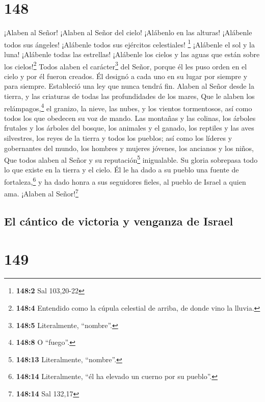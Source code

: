 \hypertarget{section-147}{%
\section{148}\label{section-147}}

 ¡Alaben al Señor! ¡Alaben al Señor del cielo! ¡Alábenlo
en las alturas!  ¡Alábenle todos sus ángeles! ¡Alábenle
todos sus ejércitos celestiales! \footnote{\textbf{148:2} Sal 103,20-22}
 ¡Alábenle el sol y la luna! ¡Alábenle todas las
estrellas!  ¡Alábenle los cielos y las aguas que están
sobre los cielos!\footnote{\textbf{148:4} Entendido como la cúpula
  celestial de arriba, de donde vino la lluvia.}  Todos
alaben el carácter\footnote{\textbf{148:5} Literalmente, ``nombre''.}
del Señor, porque él les puso orden en el cielo y por él fueron creados.
 Él designó a cada uno en su lugar por siempre y para
siempre. Estableció una ley que nunca tendrá fin.  Alaben
al Señor desde la tierra, y las criaturas de todas las profundidades de
los mares,  Que le alaben los relámpagos,\footnote{\textbf{148:8}
  O ``fuego''.} el granizo, la nieve, las nubes, y los vientos
tormentosos, así como todos los que obedecen su voz de mando.
 Las montañas y las colinas, los árboles frutales y los
árboles del bosque,  los animales y el ganado, los
reptiles y las aves silvestres,  los reyes de la tierra y
todos los pueblos; así como los líderes y gobernantes del mundo,
 los hombres y mujeres jóvenes, los ancianos y los niños,
 Que todos alaben al Señor y su reputación\footnote{\textbf{148:13}
  Literalmente, ``nombre''.} inigualable. Su gloria sobrepasa todo lo
que existe en la tierra y el cielo.  Él le ha dado a su
pueblo una fuente de fortaleza,\footnote{\textbf{148:14} Literalmente,
  ``él ha elevado un cuerno por su pueblo''.} y ha dado honra a sus
seguidores fieles, al pueblo de Israel a quien ama. ¡Alaben al
Señor!\footnote{\textbf{148:14} Sal 132,17}

\hypertarget{el-cuxe1ntico-de-victoria-y-venganza-de-israel}{%
\subsection{El cántico de victoria y venganza de
Israel}\label{el-cuxe1ntico-de-victoria-y-venganza-de-israel}}

\hypertarget{section-148}{%
\section{149}\label{section-148}}

